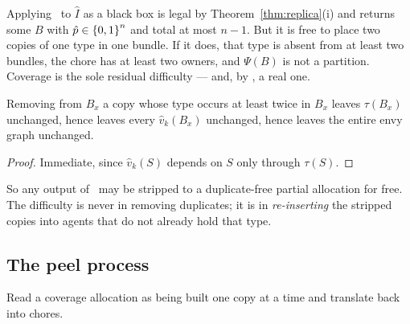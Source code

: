 Applying~\cite{BKNS22} to $\hat{I}$ as a black box is legal by
Theorem~\ref{thm:replica}(i) and returns some $B$ with $\hat{p} \in
\left\{0,1\right\}^n$ and total at most $n-1$. But it is free to place two copies of one
type in one bundle. If it does, that type is absent from at least two bundles,
the chore has at least two owners, and $\Psi(B)$ is not a partition. Coverage is
the sole residual difficulty --- and, by , a real one.

\begin{lemma}
\label{lem:dupfree}
Removing from $B_x$ a copy whose type occurs at least twice in $B_x$ leaves
$\tau(B_x)$ unchanged, hence leaves every $\hat{v}_k(B_x)$ unchanged, hence
leaves the entire envy graph unchanged.
\end{lemma}

\begin{proof}
Immediate, since $\hat{v}_k(S)$ depends on $S$ only through $\tau(S)$.
\end{proof}

So any output of~\cite{BKNS22} may be stripped to a duplicate-free partial
allocation for free. The difficulty is never in removing duplicates; it is in
\emph{re-inserting} the stripped copies into agents that do not already hold
that type.

\subsection{The peel process}
\label{sec:peel}

Read a coverage allocation as being built one copy at a time and translate back
into chores.

